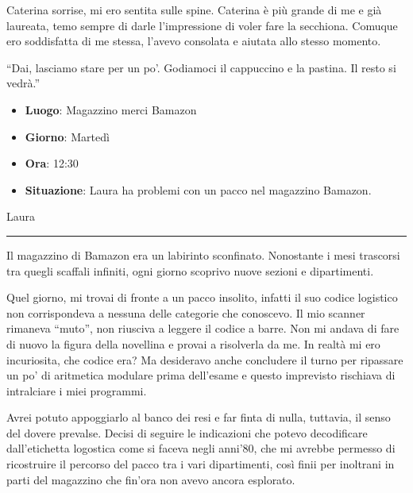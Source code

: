 Caterina sorrise, mi ero sentita sulle spine. Caterina è più grande di me e già laureata, temo sempre di darle l'impressione di voler fare la secchiona. Comuque ero soddisfatta di me stessa, l'avevo consolata e aiutata allo stesso momento.

\begin{dialogue}
 \enquote{Dai, lasciamo stare per un po'. Godiamoci il cappuccino e la pastina. Il resto si vedrà.}
\end{dialogue}

\newpage

\begin{tcolorbox}[colback=gray!1,colframe=gray!30,title=\textbf{Scheda Informativa}]

  \begin{itemize}
    \item \textbf{Luogo}: Magazzino merci Bamazon
    \item \textbf{Giorno}: Martedì
    \item \textbf{Ora}: 12:30
    \item \textbf{Situazione}: Laura ha problemi con un pacco nel magazzino Bamazon.
  \end{itemize}

\end{tcolorbox}

\vspace{1em}
\begin{center}Laura\end{center}
\hrule
\vspace{1em}
Il magazzino di Bamazon era un labirinto sconfinato. Nonostante i mesi trascorsi tra quegli scaffali infiniti, ogni giorno scoprivo nuove sezioni e dipartimenti. 

Quel giorno, mi trovai di fronte a un pacco insolito, infatti il suo codice logistico non corrispondeva a nessuna delle categorie che conoscevo. Il mio scanner rimaneva ``muto'', non riusciva a leggere il codice a barre. Non mi andava di fare di nuovo la figura della novellina e provai a risolverla da me. In realtà mi ero incuriosita, che codice era?  Ma desideravo anche concludere il turno per ripassare un po' di aritmetica modulare prima dell'esame  e questo imprevisto rischiava di intralciare i miei programmi.

Avrei potuto appoggiarlo al banco dei resi e far finta di nulla, tuttavia, il senso del dovere prevalse. Decisi di seguire le indicazioni che potevo decodificare dall'etichetta logostica come si faceva negli anni'80, che mi avrebbe permesso di ricostruire il percorso del pacco tra i vari dipartimenti, così finii per  inoltrani in parti del magazzino che fin'ora non avevo ancora esplorato.


